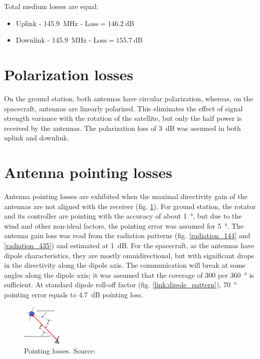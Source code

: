 \vspace{0.5cm}
Total medium losses are equal:
\begin{itemize}
    \item Uplink - \SI{145.9}{\MHz} - $\text{Loss} = \SI{146.2}{\dB}$
    \item Downlink - \SI{145.9}{\MHz} - $\text{Loss} = \SI{155.7}{\dB}$
\end{itemize}


\section{Polarization losses}
On the ground station, both antennas have circular polarization, whereas, on the spacecraft, antennas are linearly polarized. This eliminates the effect of signal strength variance with the rotation of the satellite, but only the half power is received by the antennas. The polarization loss of \SI{3}{\dB} was assumed in both uplink and downlink.

\section{Antenna pointing losses}
Antenna pointing losses are exhibited when the maximal directivity gain of the antennas are not aligned with the receiver (fig. \ref{link:pointing_loss}). For ground station, the rotator and its controller are pointing with the accuracy of about \SI{1}{\degree}, but due to the wind and other non-ideal factors, the pointing error was assumed for \SI{5}{\degree}. The antenna gain loss was read from the radiation patterns (fig. \ref{radiation_144} and \ref{radiation_435}) and estimated at \SI{1}{\dB}. For the spacecraft, as the antennas have dipole characteristics, they are mostly omnidirectional, but with significant drops in the directivity along the dipole axis. The communication will break at some angles along the dipole axis; it was assumed that the coverage of \si{300} per \SI{360}{\degree} is sufficient. At standard dipole roll-off factor (fig. \ref{link:dipole_pattern}), \SI{70}{\degree} pointing error equals to \SI{4.7}{\dB} pointing loss.

\begin{figure}
    \centering
    \includegraphics[width=0.5\paperwidth]{img/8/pointing_loss.pdf}
    \caption{Pointing losses. Source: \cite{amsat_link_budget}}
    \label{link:pointing_loss}
\end{figure}

